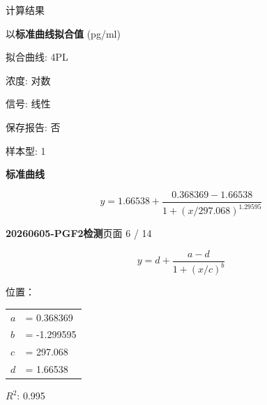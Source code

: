 \documentclass[UTF8,10pt,a4paper,fontset=fandol]{ctexart}
\begin{document}
\vspace{1em}

\noindent
计算结果

\noindent
以\textbf{标准曲线拟合值} (pg/ml)

\noindent
拟合曲线: 4PL

\noindent
浓度: 对数

\noindent
信号: 线性

\noindent
保存报告: 否

\noindent
样本型: 1

\vspace{1em}

\begin{center}
\textbf{标准曲线}

\end{center}

\[
y = 1.66538+
\frac{0.368369-1.66538}
{1+\left(x/297.068\right)^{1.29595}}
\]

\newpage

\noindent\textbf{20260605-PGF2检测}\hfill 页面 6 / 14

\[
y=d+\frac{a-d}{1+(x/c)^b}
\]

\noindent
位置：

\begin{tabular}{ll}
$a$ &= 0.368369\\
$b$ &= -1.299595\\
$c$ &= 297.068\\
$d$ &= 1.66538
\end{tabular}

\medskip

\noindent
$R^2$: 0.995

\medskip
\end{document}
